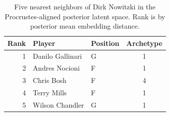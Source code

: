 \begin{table}[htbp]
  \centering\small
  \begin{tabular}{rllc}
    \toprule
    Rank & Player & Position & Archetype \\
    \midrule
    1 & Danilo Gallinari & G & 1 \\
    2 & Andres Nocioni & F & 1 \\
    3 & Chris Bosh & F & 4 \\
    4 & Terry Mills & F & 1 \\
    5 & Wilson Chandler & G & 1 \\
    \bottomrule
  \end{tabular}
  \caption{Five nearest neighbors of Dirk Nowitzki in the Procrustes-aligned posterior latent space. Rank is by posterior mean embedding distance.}
  \label{tab:Dirk_Nowitzki_neighbors}
\end{table}

